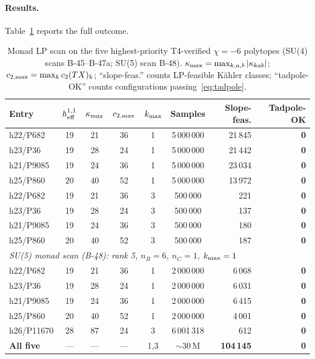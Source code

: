\documentclass[11pt,a4paper]{article}
\newcommand{\hone}{h^{1,1}}
\begin{document}
\paragraph{Results.}
Table~\ref{tab:monad_cluster} reports the full outcome.
\begin{table}[h]
\centering
\caption{%
  Monad LP scan on the five highest-priority T4-verified
  $\chi=-6$ polytopes (SU(4) scans B-45--B-47a; SU(5) scan B-48).
  $\kappa_{\rm max}=\max_{k,a,b}|\kappa_{kab}|$;
  $c_{2,\rm max}=\max_k c_2(TX)_k$; ``slope-feas.'' counts
  LP-feasible K\"ahler classes; ``tadpole-OK'' counts
  configurations passing~\eqref{eq:tadpole}.
}
\label{tab:monad_cluster}
\small
\begin{tabular}{lccc cc r r}
\toprule
Entry & $\hone_{\rm eff}$ & $\kappa_{\rm max}$ & $c_{2,\rm max}$
      & $k_{\rm max}$ & Samples & Slope-feas. & Tadpole-OK \\
\midrule
h22/P682  & 19 & 21 & 36 & 1 & 5\,000\,000 & 21\,845 & \textbf{0} \\
h23/P36   & 19 & 28 & 24 & 1 & 5\,000\,000 & 21\,442 & \textbf{0} \\
h21/P9085 & 19 & 24 & 36 & 1 & 5\,000\,000 & 23\,034 & \textbf{0} \\
h25/P860  & 20 & 40 & 52 & 1 & 5\,000\,000 & 13\,972 & \textbf{0} \\
\midrule
h22/P682  & 19 & 21 & 36 & 3 & 500\,000 &    221 & \textbf{0} \\
h23/P36   & 19 & 28 & 24 & 3 & 500\,000 &    137 & \textbf{0} \\
h21/P9085 & 19 & 24 & 36 & 3 & 500\,000 &    180 & \textbf{0} \\
h25/P860  & 20 & 40 & 52 & 3 & 500\,000 &    187 & \textbf{0} \\
\midrule
\multicolumn{8}{l}{\textit{SU(5) monad scan (B-48): rank 5, $n_B=6$, $n_C=1$, $k_{\rm max}=1$}} \\
h22/P682  & 19 & 21 & 36 & 1 & 2\,000\,000 &  6\,068 & \textbf{0} \\
h23/P36   & 19 & 28 & 24 & 1 & 2\,000\,000 &  6\,031 & \textbf{0} \\
h21/P9085 & 19 & 24 & 36 & 1 & 2\,000\,000 &  6\,415 & \textbf{0} \\
h25/P860  & 20 & 40 & 52 & 1 & 2\,000\,000 &  4\,001 & \textbf{0} \\
\midrule
h26/P11670 & 28 & 87 & 24 & 3 & 6\,001\,318 & 612 & \textbf{0} \\
\midrule
\textbf{All five} & --- & --- & --- & 1,3 & $\sim$30\,M
  & \textbf{104\,145} & \textbf{0} \\
\bottomrule
\end{tabular}
\end{table}
\end{document}
